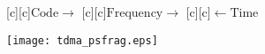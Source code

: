 \documentclass{article}
\begin{document}
\begin{figure}[htb]
  \begin{center}

        [c][c]{\hspace{5mm}$\mathrm{Code}\rightarrow$}
        [c][c]{\hspace{10mm}$\mathrm{Frequency}\rightarrow$}
        [c][c]{$\leftarrow\mathrm{Time}$}

    \texttt{[image: tdma\_psfrag.eps]}
    \end{center}
\end{figure}
\end{document}
